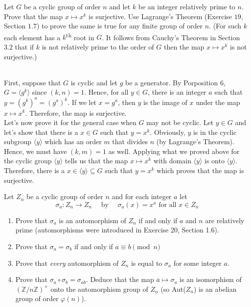 \begin{exercise}
    Let $G$ be a cyclic group of order $n$ and let $k$ be an integer relatively prime to $n$. Prove that the map $x \mapsto x^k$ is surjective. Use Lagrange's Theorem (Exercise $19$, Section $1.7$) to prove the same is true for any finite group of order $n$. (For such $k$ each element has a $k$\textsuperscript{th} root in $G$. It follows from Cauchy's Theorem in Section $3.2$ that if $k$ is not relatively prime to the order of $G$ then the map $x \mapsto x^k$ is not surjective.) \\
\end{exercise}

\begin{solution}
    \\ First, suppose that $G$ is cyclic and let $g$ be a generator. By Porposition 6, $G = \langle g^k \rangle$ since $(k,n) = 1$. Hence, for all $y \in G$, there is an integer $a$ such that $y = (g^k)^a = (g^a)^k$. If we let $x = g^a$, then $y$ is the image of $x$ under the map $x\mapsto x^k$. Therefore, the map is surjective.\\
    Let's now prove it for the general case when $G$ may not be cyclic. Let $y \in G$ and let's show that there is a $x \in G$ such that $y = x^k$. Obviously, $y$ is in the cyclic subgroup $\langle y \rangle$ which has an order $m$ that divides $n$ (by Lagrange's Theorem). Hence, we must have $(k,m) = 1$ as well. Applying what we proved above for the cyclic group $\langle y \rangle$ tells us that the map $x \mapsto x^k$ with domain $\langle y \rangle$ is onto $\langle y \rangle$. Therefore, there is a $x \in \langle y \rangle \subseteq G$ such that $y = x^k$ which proves that the map is surjective. \\
\end{solution}

\begin{exercise}
    Let $Z_n$ be a cyclic group of order $n$ and for each integer $a$ let
    $$\sigma_a : Z_n  \to Z_n \quad \text{ by } \quad \sigma_a (x) = x^a \text{ for all } x\in Z_n $$
    \begin{enumerate}[label = \textbf{(\alph*)}]
        \item Prove that $\sigma_a$ is an automorphism of $Z_n$ if and only if $a$ and $n$ are relatively prime (automorphisms were introduced in Exercise 20, Section 1.6).
        \item Prove that $\sigma_a = \sigma_b$ if and only if $a \equiv b \pmod{n}$
        \item Prove that \textit{every} automorphism of $Z_n$ is equal to $\sigma_a$ for some integer $a$.
        \item Prove that $\sigma_a \circ \sigma_b = \sigma_{ab}$. Deduce that the map $\overline{a} \mapsto \sigma_a$ is an isomorphism of $(\mathbb{Z}/n\mathbb{Z})^{\times}$ onto the automorphism group of $Z_n$ (so Aut($Z_n$) is an abelian group of order $\varphi(n)$). \\
    \end{enumerate}
\end{exercise}

